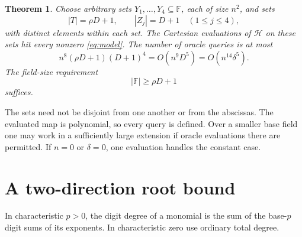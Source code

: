 \documentclass[11pt]{article}
\newtheorem{theorem}{Theorem}[section]
\newcommand{\F}{\mathbb F}
\begin{document}
\begin{theorem}\label{thm:main}
Choose arbitrary sets \(Y_1,\ldots,Y_4\subseteq\F\), each of size
\(n^2\), and sets
\[
 |T|=\rho D+1,\qquad |Z_j|=D+1\quad(1\le j\le4),
\]
with distinct elements within each set. The Cartesian evaluations
of \(\mathcal H\) on these sets hit every nonzero \eqref{eq:model}.
The number of oracle queries is at most
\begin{equation}\label{eq:bound}
 n^8(\rho D+1)(D+1)^4
 =O(n^9D^5)=O(n^{14}\delta^5).
\end{equation}
The field-size requirement
\[
 |\F|\ge\rho D+1
\]
suffices.
\end{theorem}

The sets need not be disjoint from one another or from the abscissas.
The evaluated map is polynomial, so every query is defined.
Over a smaller base field one may work in a sufficiently large
extension if oracle evaluations there are permitted.
If \(n=0\) or \(\delta=0\), one evaluation handles the constant case.

\section{A two-direction root bound}

In characteristic \(p>0\), the digit degree of a monomial is the sum
of the base-\(p\) digit sums of its exponents.
In characteristic zero use ordinary total degree.
\end{document}
